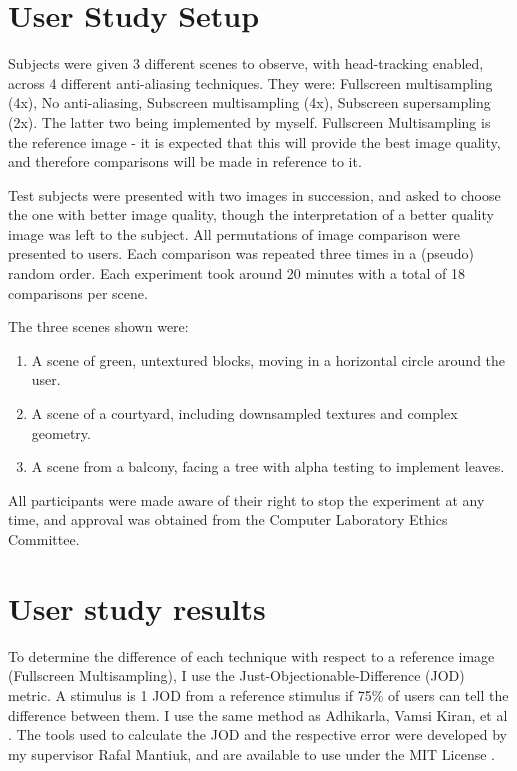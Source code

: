 \documentclass[12pt,a4paper,twoside,openright]{report}
\begin{document}
\section{User Study Setup}\label{studySetup}

Subjects were given 3 different scenes to observe, with head-tracking enabled, across 4 different anti-aliasing techniques. They were: Fullscreen multisampling (4x), No anti-aliasing, Subscreen multisampling (4x), Subscreen supersampling (2x). The latter two being implemented by myself. Fullscreen Multisampling is the reference image - it is expected that this will provide the best image quality, and therefore comparisons will be made in reference to it.

Test subjects were presented with two images in succession, and asked to choose the one with better image quality, though the interpretation of a better quality image was left to the subject. All permutations of image comparison were presented to users. Each comparison was repeated three times in a (pseudo) random order. Each experiment took around 20 minutes with a total of 18 comparisons per scene.

The three scenes shown were:

\begin{enumerate}
\item A scene of green, untextured blocks, moving in a horizontal circle around the user.

\item A scene of a courtyard, including downsampled textures and complex geometry.

\item A scene from a balcony, facing a tree with alpha testing to implement leaves.
\end{enumerate}

All participants were made aware of their right to stop the experiment at any time, and approval was obtained from the Computer Laboratory Ethics Committee. 

\section{User study results}\label{studyResults}

To determine the difference of each technique with respect to a reference image (Fullscreen Multisampling), I use the Just-Objectionable-Difference (JOD) metric. A stimulus is 1 JOD from a reference stimulus if 75\% of users can tell the difference between them. I use the same method as Adhikarla, Vamsi Kiran, et al \cite{rafalPaper}. The tools used to calculate the JOD and the respective error were developed by my supervisor Rafal Mantiuk, and are available to use under the MIT License \cite{pwcomp}. 
\end{document}
